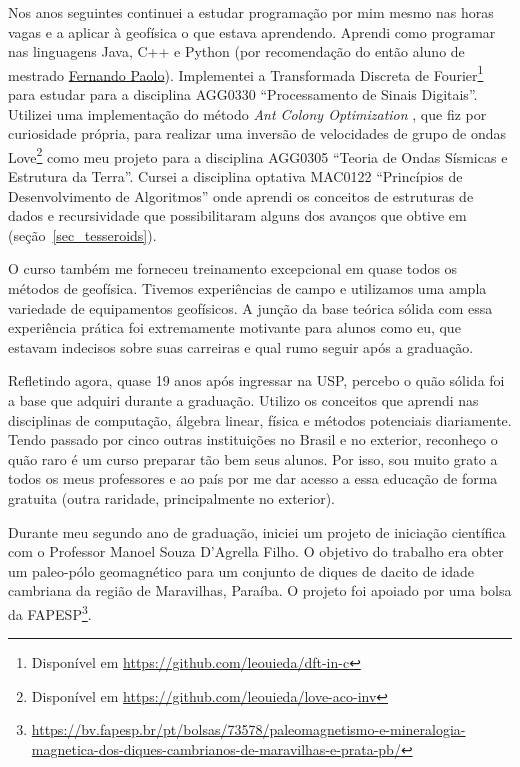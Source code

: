 \documentclass[10pt,a4paper,oneside]{book}
\begin{document}
Nos anos seguintes continuei a estudar programação por mim mesmo nas horas
vagas e a aplicar à geofísica o que estava aprendendo.
Aprendi como programar nas linguagens Java, C++ e Python (por recomendação do
então aluno de mestrado \href{https://www.linkedin.com/in/fspaolo/}{Fernando Paolo}).
Implementei a Transformada Discreta de Fourier\footnote{Disponível em
\url{https://github.com/leouieda/dft-in-c}} para estudar para a disciplina
AGG0330 ``Processamento de Sinais Digitais''.
Utilizei uma implementação do método \textit{Ant Colony Optimization}
\citep{Socha2008}, que fiz por curiosidade própria, para realizar uma inversão
de velocidades de grupo de ondas
Love\footnote{Disponível em \url{https://github.com/leouieda/love-aco-inv}}
como meu projeto para a disciplina AGG0305 ``Teoria de Ondas Sísmicas e
Estrutura da Terra''.
Cursei a disciplina optativa MAC0122 ``Princípios de Desenvolvimento de
Algoritmos'' onde aprendi os conceitos de estruturas de dados e recursividade
que possibilitaram alguns dos avanços que obtive em \citet{Uieda2016}
(seção~\ref{sec_tesseroids}).

O curso também me forneceu treinamento excepcional em quase todos os métodos de
geofísica.
Tivemos experiências de campo e utilizamos uma ampla variedade de equipamentos
geofísicos.
A junção da base teórica sólida com essa experiência prática foi
extremamente motivante para alunos como eu, que estavam indecisos sobre suas
carreiras e qual rumo seguir após a graduação.

Refletindo agora, quase 19 anos após ingressar na USP, percebo o quão sólida
foi a base que adquiri durante a graduação. Utilizo os conceitos que aprendi
nas disciplinas de computação, álgebra linear, física e métodos potenciais
diariamente. Tendo passado por cinco outras instituições no Brasil e no
exterior, reconheço o quão raro é um curso preparar tão bem seus alunos.
Por isso, sou muito grato a todos os meus professores e ao país por me dar
acesso a essa educação de forma gratuita (outra raridade, principalmente no
exterior).

Durante meu segundo ano de graduação, iniciei um projeto de iniciação
científica com o Professor Manoel Souza D'Agrella Filho.
O objetivo do trabalho era obter um paleo-pólo geomagnético para um conjunto
de diques de dacito de idade cambriana da região de Maravilhas, Paraíba.
O projeto foi apoiado por uma bolsa da FAPESP\footnote{\url{https://bv.fapesp.br/pt/bolsas/73578/paleomagnetismo-e-mineralogia-magnetica-dos-diques-cambrianos-de-maravilhas-e-prata-pb/}}.
\end{document}
